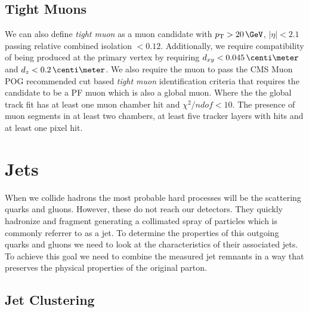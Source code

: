 \subsection{Tight Muons}


We can also define \textit{tight muon} as a muon candidate with $\pt>20\,\GeV$, $|\eta|<2.1$ passing relative combined isolation $<0.12$. Additionally, we require compatibility of being produced at the primary vertex by requiring $d_{xy}<0.045\,\centi\meter$ and $d_z < 0.2\,\centi\meter$. We also require the muon to pass the  \gls{CMS} Muon \gls{POG} recommended cut based \textit{tight muon} identification criteria that requires the candidate to be a \gls{PF} muon which is also a global muon. Where the the global track fit has at least one muon chamber hit and $\chi^2/ndof < 10$. The presence of muon segments in at least two chambers, at least five tracker layers with hits and at least one pixel hit.

\section{Jets}
\label{SECTION:EventReconstructionAndSimulation_Jets}


When we collide hadrons the most probable hard processes will be the scattering quarks and gluons. However, these do not reach our detectors. They quickly hadronize and fragment generating a collimated spray of particles which is commonly referrer to as a jet. To determine the properties of this outgoing quarks and gluons we need to look at the characteristics of their associated jets. To achieve this goal we need to combine the measured jet remnants in a way that preserves the physical properties of the original parton.

\subsection{Jet Clustering}
\label{SECTION:EventReconstructionAndSimulation_Jets_JetClustering}

